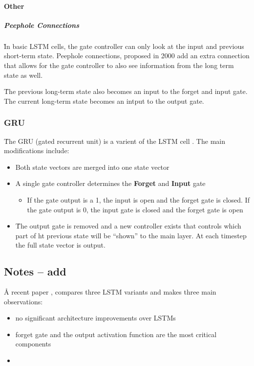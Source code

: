 \paragraph{Other}

\subparagraph{Peephole Connections}

\r{In basic LSTM cells, the gate controller can only look at the input and previous short-term state. Peephole connections, proposed in 2000  add an extra connection that allows for the gate controller to also see information from the long term state as well. }

\r{The previous long-term state also becomes an input to the forget and input gate. The current long-term state becomes an intput to the output gate.}



\subsubsection{GRU}

\r{The GRU (gated recurrent unit) is a varient of the LSTM cell . The main modifications include:}

\begin{itemize}[noitemsep,topsep=0pt]
	\item Both state vectors are merged into one state vector
	\item A single gate controller determines the \textbf{Forget} and \textbf{Input} gate
	\begin{itemize}[noitemsep,topsep=0pt]
		\item If the gate output is a 1, the input is open and the forget gate is closed. If the gate output is 0, the input gate is closed and the forget gate is open
	\end{itemize}
	\item \r{The output gate is removed and a new controller exists that controls which part of ht previous state will be ``shown'' to the main layer}. At each timestep the full state vector is output.
\end{itemize}

\subsection{Notes -- add}

\r{A recent paper , compares three LSTM variants and makes three main observations:}

\begin{itemize}[noitemsep,topsep=0pt]
	\item no significant architecture improvements over LSTMs
	\item forget gate and the output activation function are the most critical components
	\item {}
\end{itemize}




